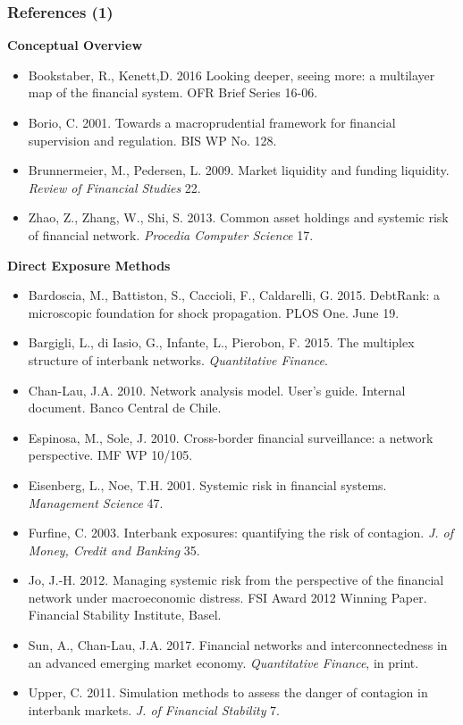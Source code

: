 \documentclass[aspectratio=43,dvipsnames,usenames, svgnames]{beamer}
\begin{document}
\begin{frame} %
\frametitle{References (1)}
\scriptsize{\textbf{Conceptual Overview}}
\tiny{
\begin{itemize}
	\item Bookstaber, R., Kenett,D. 2016 Looking deeper, seeing more: a multilayer map of the financial system. OFR Brief Series 16-06.
	\item Borio, C. 2001. Towards a macroprudential framework for financial supervision and regulation. BIS WP No. 128.
	\item Brunnermeier, M., Pedersen, L. 2009. Market liquidity and funding liquidity. \textit{Review of Financial Studies} 22.
	\item Zhao, Z., Zhang, W., Shi, S. 2013. Common asset holdings and systemic risk of financial network. \textit{Procedia Computer Science} 17.
\end{itemize}
}
\vspace{1ex}
\scriptsize{\textbf{Direct Exposure Methods}}
\tiny{
\begin{itemize}
	\item Bardoscia, M., Battiston, S., Caccioli, F., Caldarelli, G. 2015. DebtRank: a microscopic foundation for shock propagation. PLOS One. June 19.
	\item Bargigli, L., di Iasio, G., Infante, L., Pierobon, F. 2015. The multiplex structure of interbank networks. \textit{Quantitative Finance}.
	\item Chan-Lau, J.A. 2010. Network analysis model. User's guide. Internal document. Banco Central de Chile.
	\item Espinosa, M., Sole, J. 2010. Cross-border financial surveillance: a network perspective. IMF  WP 10/105.
	\item Eisenberg, L., Noe, T.H. 2001. Systemic risk in financial systems. \textit{Management Science} 47. 
	\item Furfine, C. 2003. Interbank exposures: quantifying the risk of contagion. \textit{J. of Money, Credit and Banking} 35.
	\item Jo, J.-H. 2012. Managing systemic risk from the perspective of the financial network under macroeconomic distress. FSI Award 2012 Winning Paper. Financial Stability Institute, Basel.
	\item Sun, A., Chan-Lau, J.A. 2017. Financial networks and interconnectedness in an advanced emerging market economy. \textit{Quantitative Finance}, in print.
	\item Upper, C. 2011. Simulation methods to assess the danger of contagion in interbank markets. \textit{J. of Financial Stability} 7.
\end{itemize}
}
\end{frame}
\end{document}
